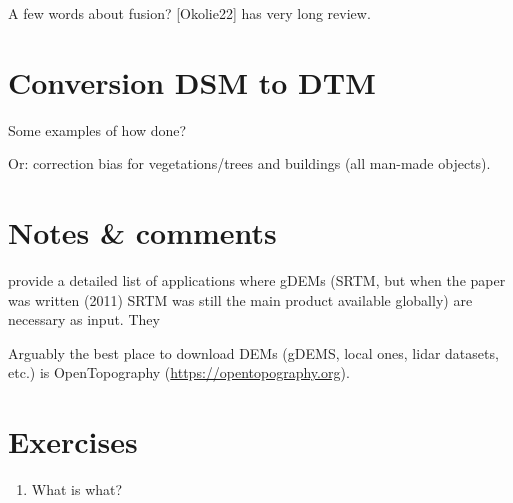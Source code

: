 A few words about fusion? [Okolie22] has very long review.


%
\section{Conversion DSM to DTM}

Some examples of how done?

Or: correction bias for vegetations/trees and buildings (all man-made objects).

%
\section{Notes \& comments}

\citet{Yang11} provide a detailed list of applications where gDEMs (SRTM, but when the paper was written (2011) SRTM was still the main product available globally) are necessary as input.
They 

Arguably the best place to download DEMs (gDEMS, local ones, lidar datasets, etc.) is OpenTopography (\url{https://opentopography.org}).




%
\section{Exercises}

\begin{enumerate}
  \item What is what?
\end{enumerate}
